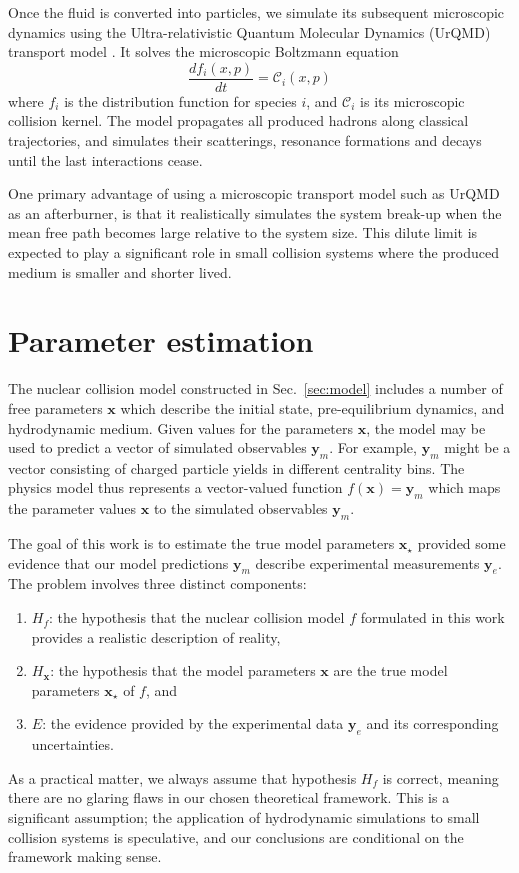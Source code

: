 \documentclass[aps,prc,reprint,amsmath,nofootinbib]{revtex4-1}
\newcommand{\x}{\mathbf x}
\newcommand{\y}{\mathbf y}
\begin{document}
Once the fluid is converted into particles, we simulate its subsequent microscopic dynamics using the Ultra-relativistic Quantum Molecular Dynamics (UrQMD) transport model \cite{Bass:1998ca, Bleicher:1999xi}.
It solves the microscopic Boltzmann equation
\begin{equation}
  \frac{df_i(x, p)}{dt} = \mathcal{C}_i(x, p)
\end{equation}
where $f_i$ is the distribution function for species $i$, and $\mathcal{C}_i$ is its microscopic collision kernel.
The model propagates all produced hadrons along classical trajectories, and simulates their scatterings, resonance formations and decays until the last interactions cease.

One primary advantage of using a microscopic transport model such as UrQMD as an afterburner, is that it realistically simulates the system break-up when the mean free path becomes large relative to the system size.
This dilute limit is expected to play a significant role in small collision systems where the produced medium is smaller and shorter lived.


\section{Parameter estimation}
\label{sec:calibration}

The nuclear collision model constructed in Sec.~\ref{sec:model} includes a number of free parameters $\x$ which describe the initial state, pre-equilibrium dynamics, and hydrodynamic medium.
Given values for the parameters $\x$, the model may be used to predict a vector of simulated observables $\y_m$.
For example, $\y_m$ might be a vector consisting of charged particle yields in different centrality bins.
The physics model thus represents a vector-valued function $f(\x) = \y_m$ which maps the parameter values $\x$ to the simulated observables $\y_m$.

The goal of this work is to estimate the true model parameters $\x_\star$ provided some evidence that our model predictions $\y_m$ describe experimental measurements $\y_e$.
The problem involves three distinct components:
\begin{enumerate}[itemsep=0pt, leftmargin=2\parindent]
  \item $H_f$: the hypothesis that the nuclear collision model $f$ formulated in this work provides a realistic description of reality,
  \item $H_\x$: the hypothesis that the model parameters $\x$ are the true model parameters $\x_\star$ of $f$, and
  \item $E$: the evidence provided by the experimental data $\y_e$ and its corresponding uncertainties.
\end{enumerate}
As a practical matter, we always assume that hypothesis $H_f$ is correct, meaning there are no glaring flaws in our chosen theoretical framework.
This is a significant assumption; the application of hydrodynamic simulations to small collision systems is speculative, and our conclusions are conditional on the framework making sense.
\end{document}
